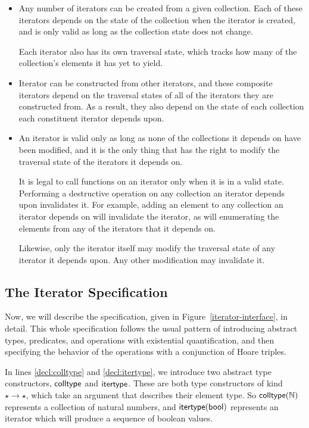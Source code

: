 \begin{itemize}
\item Any number of iterators can be created from a given collection.
  Each of these iterators depends on the state of the collection when
  the iterator is created, and is only valid as long as the collection
  state does not change.

  Each iterator also has its own traversal state, which tracks how 
  many of the collection's elements it has yet to yield. 

\item Iterator can be constructed from other iterators, and these
  composite iterators depend on the traversal states of all of the
  iterators they are constructed from. As a result, they also depend
  on the state of each collection each constituent iterator depends
  upon. 

\item An iterator is valid only as long as none of the collections it
  depends on have been modified, and it is the only thing that has the
  right to modify the traversal state of the iterators it depends on.

  It is legal to call functions on an iterator only when it is in a
  valid state. Performing a destructive operation on any collection an
  iterator depends upon invalidates it. For example, adding an element
  to any collection an iterator depends on will invalidate the
  iterator, as will enumerating the elements from any of the iterators
  that it depends on.

  Likewise, only the iterator itself may modify the traversal state of
  any iterator it depends upon. Any other modification may invalidate
  it.
\end{itemize}

\subsection{The Iterator Specification}

Now, we will describe the specification, given in
Figure~\ref{iterator-interface}, in detail. This whole specification
follows the usual pattern of introducing abstract types, predicates,
and operations with existential quantification, and then specifying
the behavior of the operations with a conjunction of Hoare triples.

In lines \ref{decl:colltype} and \ref{decl:itertype}, we introduce two
abstract type constructors, $\mathsf{colltype}$ and $\mathsf{itertype}$. These are
both type constructors of kind $\star \to \star$, which take an argument
that describes their element type. So $\mathsf{colltype}(\mathbb{N})$ represents a
collection of natural numbers, and $\mathsf{itertype}(\mathsf{bool})$ represents an
iterator which will produce a sequence of boolean values.

